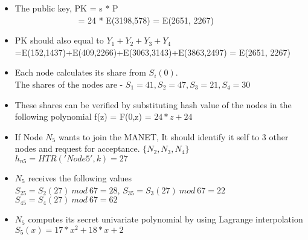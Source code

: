 \documentclass[11pt,a4paper]{llncs}
\begin{document}
        \begin{itemize}
        \item The public key, PK = s * P \\  $  \hspace{3cm} $   = 24 * E(3198,578) = E(2651, 2267)
        \item PK should also equal to $Y_1 + Y_2 + Y_3 + Y_4$\\
        =E(152,1437)+E(409,2266)+E(3063,3143)+E(3863,2497) = E(2651, 2267)
        \item Each node calculates its share from $S_i(0)$.\\
        The shares of the nodes are - $S_1 = 41, S_2 = 47 ,S_3 = 21, S_4 = 30$
        \item These shares can be verified by substituting hash value of the nodes in the following polynomial f(z) = F(0,z)  \hspace{0.6cm} = $ 24*z + 24$
        \end{itemize}
    
    
        \begin{itemize}
        \item If Node $N_5$ wants to join the MANET, It should identify it self to 3 other nodes and request for acceptance. $\{N_2,N_3,N_4\}$ \\
        $h_{n5}= HTR('Node5',k) = 27$
        \item $N_5$ receives the following values \\
        $ S_{25} = S_2(27)\ mod\  67= 28  $,
        $ S_{35} = S_3(27)\ mod\  67=22 $\\
        $ S_{45} = S_4(27)\ mod\  67=62  $
        \item $N_5$ computes its secret univariate polynomial by using Lagrange interpolation 
        $S_5(x) =  17*x^2 + 18*x + 2 $
        \end{itemize}
\end{document}
